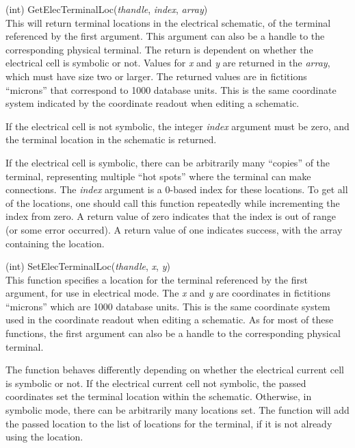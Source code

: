 \begin{description}
\item{(int) \vt GetElecTerminalLoc({\it thandle\/}, {\it index\/},
 {\it array\/})}\\
This will return terminal locations in the electrical schematic, of
the terminal referenced by the first argument.  This argument can also
be a handle to the corresponding physical terminal.  The return is
dependent on whether the electrical cell is symbolic or not.  Values
for {\it x} and {\it y} are returned in the {\it array}, which must
have size two or larger.  The returned values are in fictitions
``microns'' that correspond to 1000 database units.  This is the same
coordinate system indicated by the coordinate readout when editing a
schematic.

If the electrical cell is not symbolic, the integer {\it index}
argument must be zero, and the terminal location in the schematic is
returned.

If the electrical cell is symbolic, there can be arbitrarily many
``copies'' of the terminal, representing multiple ``hot spots'' where
the terminal can make connections.  The {\it index} argument is a
0-based index for these locations.  To get all of the locations, one
should call this function repeatedly while incrementing the index from
zero.  A return value of zero indicates that the index is out of range
(or some error occurred).  A return value of one indicates success,
with the array containing the location.

\item{(int) \vt SetElecTerminalLoc({\it thandle\/}, {\it x\/}, {\it y\/})}\\
This function specifies a location for the terminal referenced by the
first argument, for use in electrical mode.  The {\it x} and {\it y}
are coordinates in fictitions ``microns'' which are 1000 database
units.  This is the same coordinate system used in the coordinate
readout when editing a schematic.  As for most of these functions, the
first argument can also be a handle to the corresponding physical
terminal.
  
The function behaves differently depending on whether the electrical
current cell is symbolic or not.  If the electrical current cell not
symbolic, the passed coordinates set the terminal location within the
schematic.  Otherwise, in symbolic mode, there can be arbitrarily many
locations set.  The function will add the passed location to the list
of locations for the terminal, if it is not already using the
location.


\end{description}
